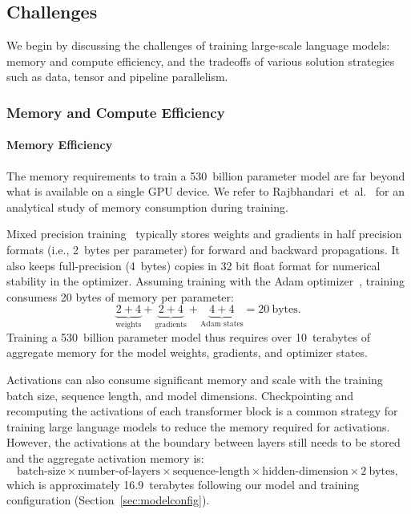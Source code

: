 \documentclass[11pt]{article}
\begin{document}
\subsection{Challenges}

We begin by discussing the challenges of training large-scale language models: memory and compute efficiency, and the tradeoffs of various solution strategies such as data, tensor and pipeline parallelism.

\subsubsection{Memory and Compute Efficiency}
    
\paragraph{Memory Efficiency} The memory requirements to train a 530~billion parameter
model are far beyond what is available on a single GPU device. 
We refer to Rajbhandari~et~al.~\cite{rajbhandari2021zero} for an analytical
study of memory consumption during training.

Mixed precision training~\cite{micikevicius2017mixed} typically stores weights and gradients in half precision formats (i.e., 2~bytes per parameter) 
for forward and backward propagations. It also keeps full-precision (4~bytes) copies in 32 bit float format for numerical stability
in the optimizer. Assuming training with the Adam optimizer~\cite{kingma2014adam},
training consumess 20 bytes of memory per parameter:
$$
    \underbrace{2 + 4}_{\text{weights}} 
        + \underbrace{2 + 4}_{\text{gradients}}
        + \underbrace{4 + 4}_{\text{Adam states}}
    = 20\ \text{bytes}.
$$
Training a 530~billion parameter model thus requires over 10~terabytes of aggregate memory for the model weights, gradients, and optimizer states.

Activations can also consume significant memory and scale with the training batch size, sequence length,
and model dimensions. Checkpointing and recomputing the activations of
each transformer block is a common strategy for training large language models to reduce the memory required for activations.
However, the activations at the boundary between layers still needs to be stored and the aggregate activation memory is:
$$
    \text{batch-size} \times \text{number-of-layers} \times \text{sequence-length} \times \text{hidden-dimension} \times 2\ \text{bytes},
$$
which is approximately 16.9~terabytes following our model and training configuration (Section~\ref{sec:modelconfig}).
\end{document}
